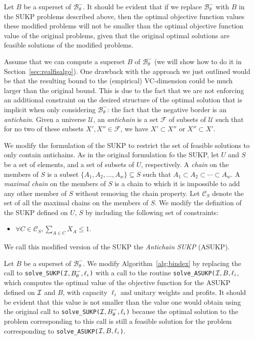 Let $B$ be a superset of $\mathcal{B}^-_\theta$. It should be evident that if we
replace $\mathcal{B}^-_\theta$ with $B$ in the SUKP problems described above,
then the optimal objective function values these modified problems will not be
smaller than the optimal objective function value of the original problems,
given that the original optimal solutions are feasible solutions of the modified
problems. 

Assume that we can compute a superset $B$ of $\mathcal{B}^-_\theta$ (we will
show how to do it in Section~\ref{sec:realfisalgo}). One drawback with the approach we
just outlined would be that the resulting bound to the (empirical) VC-dimension
could be much larger than the original bound. This is due to the fact that we
are not enforcing an additional constraint on the desired structure of the
optimal solution that is implicit when only considering $\mathcal{B}^-_\theta$:
the fact that the negative border is an \emph{antichain}.
Given a universe $\mathcal{U}$, an \emph{antichain} is a set
$\mathcal{F}$ of subsets of $\mathcal{U}$ such that for no two of these subsets
$X',X''\in\mathcal{F}$, we have $X'\subset X''$ or $X''\subset X'$.

We modify the formulation of the SUKP to restrict the set of feasible solutions
to only contain antichains. As in the original formulation fo the SUKP, let $U$
and $S$ be a set of elements, and a set of subsets of $U$, respectively. A \emph{chain}
on the members of $S$ is a subset $\{A_1,A_2,\dotsc,A_w\}\subseteq S$ such that
$A_1\subset A_2\subset\dotsb\subset A_w$. A \emph{maximal chain} on the members
of $S$ is a chain to which it is impossible to add any other member of $S$
without removing the chain property. Let $\mathcal{C}_S$ denote the set of all
the maximal chains on the members of $S$.
We modify the definition of the SUKP defined on $U$, $S$ by including
the following set of constraints:
\begin{itemize}
  \item $\forall C\in\mathcal{C}_S, \sum_{A\in C} X_A\le 1$.
\end{itemize}
We call this modified version of the SUKP the \emph{Antichain SUKP} (ASUKP).

Let $B$ be a superset of $\mathcal{B}^-_\theta$. We modify
Algorithm~\ref{alg:bindex} by replacing the call to \texttt{solve\_SUKP(${\cal I},B^-_\theta,\ell_i$)}
with a call to the routine \texttt{solve\_ASUKP(${\cal I},B,\ell_i$}, which computes the
optimal value of the objective function for the ASUKP defined on ${\cal I}$ and $B$, with
capacity $\ell_i$ and unitary weights and profits. It should be evident that
this value is not smaller than the value one would obtain using the original
call to \texttt{solve\_SUKP(${\cal I},B^-_\theta,\ell_i$)} because the optimal
solution to the problem corresponding to this call is still a feasible solution
for the problem corresponding to \texttt{solve\_ASUKP(${\cal I},B,\ell_i$)}.

